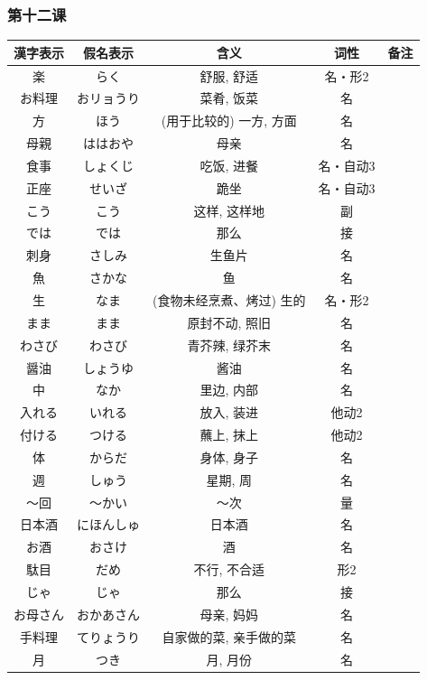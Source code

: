 \subsubsection{第十二课}
\begin{longtable}{|c|c|c|c|c|}
    \hline
漢字表示 & 假名表示  & 含义 & 词性 & 备注 \\ \hline\hline  
楽 & らく & 舒服, 舒适 & 名・形2 & \\ \hline
お料理 & おリョうり & 菜肴, 饭菜& 名 &  \\ \hline
方 & ほう & (用于比较的) 一方, 方面 & 名 & \\ \hline
母親 & ははおや & 母亲 & 名 & \\ \hline
食事 & しょくじ & 吃饭, 进餐 & 名・自动3 & \\ \hline
正座 & せいざ & 跪坐 & 名・自动3 & \\ \hline
こう & こう & 这样, 这样地 & 副 & \\ \hline
では & では & 那么 & 接 & \\ \hline
刺身 & さしみ & 生鱼片 & 名 & \\ \hline
魚 & さかな & 鱼 & 名 & \\ \hline
生 & なま & (食物未经烹煮、烤过) 生的 & 名・形2 & \\ \hline
まま & まま & 原封不动, 照旧 & 名 & \\ \hline
わさび & わさび & 青芥辣, 绿芥末 & 名 & \\ \hline
醤油 & しょうゆ & 酱油 & 名 & \\ \hline
中 & なか & 里边, 内部 & 名 & \\ \hline
入れる & いれる & 放入, 装进 & 他动2 & \\ \hline
付ける & つける & 蘸上, 抹上 & 他动2 & \\ \hline
体 & からだ & 身体, 身子 & 名 & \\ \hline
週 & しゅう & 星期, 周 & 名 & \\ \hline
〜回 & 〜かい & 〜次 & 量 & \\ \hline
日本酒 & にほんしゅ & 日本酒 & 名 & \\ \hline
お酒 & おさけ & 酒 & 名 & \\ \hline
駄目 & だめ & 不行, 不合适 & 形2 & \\ \hline
じゃ & じゃ & 那么 & 接 & \\ \hline
お母さん & おかあさん & 母亲, 妈妈 & 名 & \\ \hline
手料理 & てりょうり & 自家做的菜, 亲手做的菜 & 名 & \\ \hline
月 & つき & 月, 月份 & 名 & \\ \hline

\end{longtable}
